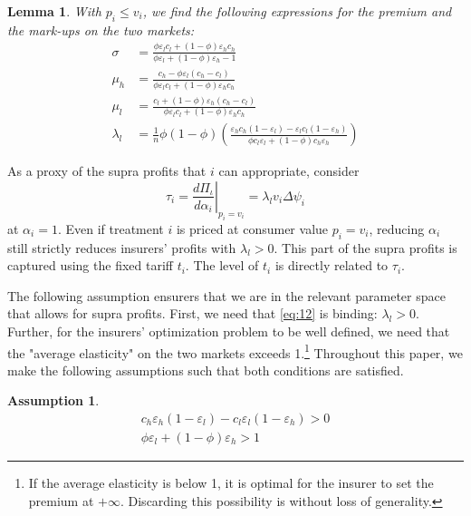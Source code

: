 \documentclass[12pt,english,a4paper]{article}
\newtheorem{assumption}{Assumption}
\newtheorem{lemma}{Lemma}
\begin{document}
\begin{lemma}
\label{Two_part_tariff}
With \(p_i \leq v_i\), we find the following expressions for the premium and the mark-ups on the two markets:
\begin{align}
\label{eq:29}
\sigma &= \frac{\phi \varepsilon_l c_l +(1-\phi) \varepsilon_h c_h }{\phi \varepsilon_l +(1-\phi) \varepsilon_h-1} \\
\label{eq:29a}
\mu_h &=  \frac{c_h -\phi \varepsilon_l (c_{h}-c_l)}{\phi \varepsilon_lc_l +(1-\phi) \varepsilon_h c_h} \\
\label{eq:29b}
\mu_l &=  \frac{c_l +(1-\phi) \varepsilon_h (c_{h}-c_l)}{\phi \varepsilon_lc_l +(1-\phi) \varepsilon_h c_h} \\
\label{eq:43}
\lambda_l &= \frac{1}{n}\phi(1-\phi) \left( \frac{\varepsilon_h c_h (1-\varepsilon_l) - \varepsilon_l c_l (1-\varepsilon_h)}{\phi c_l\varepsilon_l + (1-\phi) c_h \varepsilon_h} \right)
\end{align}
\end{lemma}

As a proxy of the supra profits that \(i\) can appropriate, consider
\begin{equation}
\label{eq:1}
\tau_i = \left. \frac{d\Pi_{\iota}}{d\alpha_{i}} \right|_{p_i=v_i} = \lambda_l v_i \Delta \psi_i
\end{equation}
at \(\alpha_i=1\). Even if treatment \(i\) is priced at consumer value \(p_i = v_i\), reducing \(\alpha_i\) still strictly reduces insurers' profits with \(\lambda_l > 0\). This part of the supra profits is captured using the fixed tariff \(t_i\). The level of \(t_i\) is directly related to \(\tau_i\).

The following assumption ensurers that we are in the relevant parameter space that allows for supra profits. First, we need that \eqref{eq:12} is binding: \(\lambda_l >0\). Further, for the insurers' optimization problem to be well defined, we need that the "average elasticity" on the two markets exceeds 1.\footnote{If the average elasticity is below 1, it is optimal for the insurer to set the premium at \(+\infty\). Discarding this possibility is without loss of generality.} Throughout this paper, we make the following assumptions such that both conditions are satisfied.

\begin{assumption}
\label{Elasticities}
\begin{align}
\label{eq:33}
c_h \varepsilon_h (1- \varepsilon_l )-c_l \varepsilon_l(1-\varepsilon_h) > 0 \\
\label{eq:33a}
\phi \varepsilon_l + (1-\phi) \varepsilon_h > 1
\end{align}
\end{assumption}
\end{document}
